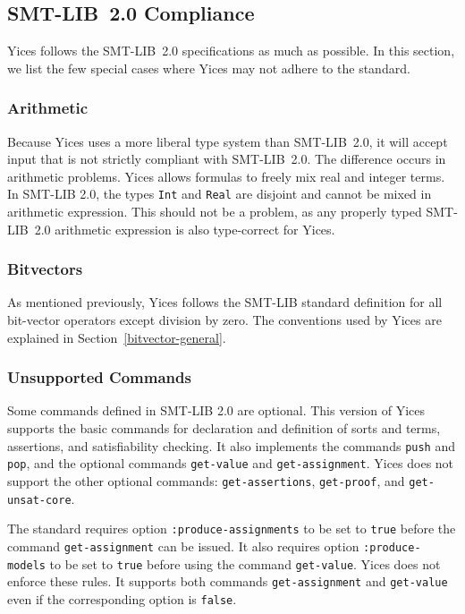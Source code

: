\documentclass[11pt,twoside,fleqn,openright,titlepage]{cslreport}
\begin{document}
\subsection{SMT-LIB~2.0 Compliance}

Yices follows the SMT-LIB~2.0 specifications as much as possible. In
this section, we list the few special cases where Yices may not adhere
to the standard.

\subsubsection*{Arithmetic}

Because Yices uses a more liberal type system than SMT-LIB~2.0, it
will accept input that is not strictly compliant with SMT-LIB~2.0. The
difference occurs in arithmetic problems. Yices allows formulas to
freely mix real and integer terms. In SMT-LIB 2.0, the types
\texttt{Int} and \texttt{Real} are disjoint and cannot be mixed in
arithmetic expression. This should not be a problem, as any properly
typed SMT-LIB~2.0 arithmetic expression is also type-correct for
Yices.


\subsubsection*{Bitvectors}

As mentioned previously, Yices follows the SMT-LIB standard definition
for all bit-vector operators except division by zero. The conventions
used by Yices are explained in Section~\ref{bitvector-general}.

\subsubsection*{Unsupported Commands}

Some commands defined in SMT-LIB 2.0 are optional. This version of
Yices supports the basic commands for declaration and definition of
sorts and terms, assertions, and satisfiability checking. It also
implements the commands \texttt{push} and \texttt{pop}, and the
optional commands \texttt{get-value} and \texttt{get-assignment}.
Yices does not support the other optional commands:
\texttt{get-assertions}, \texttt{get-proof}, and
\texttt{get-unsat-core}.

\medskip\noindent
The standard requires option \texttt{:produce-assignments} to be set
to \texttt{true} before the command \texttt{get-assignment} can be
issued.  It also requires option \texttt{:produce-models} to be set to
\texttt{true} before using the command \texttt{get-value}. Yices does
not enforce these rules. It supports both commands
\texttt{get-assignment} and \texttt{get-value} even if the
corresponding option is \texttt{false}.
\end{document}
